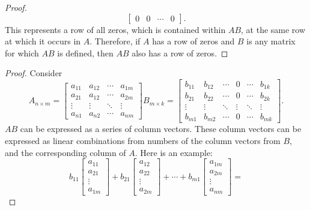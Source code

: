 \documentclass{article}
\begin{document}
\begin{question}{1.3}{}
{\begin{enumerate}
\begin{proof}
\[          \begin{bmatrix} 0 & 0 & \cdots & 0 \end{bmatrix}.
        \]
        This represents a row of all zeros, which is contained within $AB$, at the same row at which it occurs in $A$. Therefore, if $A$ has a row of zeros and $B$ is any matrix for which $AB$ is defined, then $AB$ also has a row of zeros.
      \end{proof}
      \begin{proof}
        Consider
        \[
          A_{n \times m} = \begin{bmatrix}
            a_{11} & a_{12} & \cdots & a_{1m} \\
            a_{21} & a_{12} & \cdots & a_{2m} \\
            \vdots & \vdots & \ddots & \vdots \\
            a_{n1} & a_{n2} & \cdots & a_{nm}
          \end{bmatrix}
          B_{m \times k} = \begin{bmatrix}
            b_{11} & b_{12} & \cdots & 0      & \cdots & b_{1k} \\
            b_{21} & b_{22} & \cdots & 0      & \cdots & b_{2k} \\
            \vdots & \vdots & \ddots & \vdots & \ddots & \vdots \\
            b_{m1} & b_{m2} & \cdots & 0      & \cdots & b_{mk}
          \end{bmatrix}.
        \]
        $AB$ can be expressed as a series of column vectors. These column vectors can be expressed as linear combinations from numbers of the column vectors from $B$, and the corresponding column of $A$. Here is an example:
        \[
          b_{11}\begin{bmatrix} a_{11} \\ a_{21} \\ \vdots \\ a_{1m}\end{bmatrix} +
          b_{21}\begin{bmatrix} a_{12} \\ a_{22} \\ \vdots \\ a_{2m}\end{bmatrix} + \cdots +
          b_{m1}\begin{bmatrix} a_{1m} \\ a_{2m} \\ \vdots \\ a_{nm}\end{bmatrix} =
\]
\end{proof}
\end{enumerate}}
\end{question}
\end{document}

